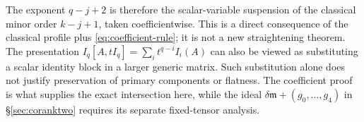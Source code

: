 The exponent $q-j+2$ is therefore the scalar-variable suspension of
the classical minor order $k-j+1$, taken coefficientwise. This is a
direct consequence of the classical profile plus
\eqref{eq:coefficient-rule}; it is not a new straightening theorem.
The presentation $I_q[A,tI_q]=\sum_i t^{q-i}I_i(A)$ can also be
viewed as substituting a scalar identity block in a larger generic
matrix. Such substitution alone does not justify preservation of
primary components or flatness. The coefficient proof is what supplies
the exact intersection here, while the ideal $\delta\mathfrak m+
(g_0,\ldots,g_4)$ in \S\ref{sec:coranktwo} requires its separate
fixed-tensor analysis.
